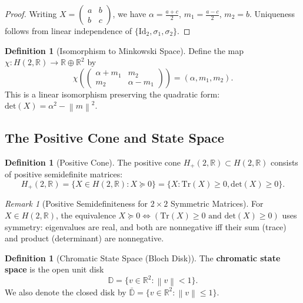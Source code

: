 \documentclass[11pt]{article}
\theoremstyle{plain}
\theoremstyle{definition}
\newtheorem{definition}[theorem]{Definition}
\theoremstyle{remark}
\newtheorem{remark}[theorem]{Remark}
\newcommand{\R}{\mathbb{R}}
\newcommand{\D}{\mathbb{D}}
\newcommand{\norm}[1]{\left\lVert #1 \right\rVert}
\newcommand{\Tr}{\mathrm{Tr}}
\newcommand{\Det}{\mathrm{det}}
\newcommand{\Id}{\mathrm{Id}}
\begin{document}
\begin{proof}
Writing $X = \begin{pmatrix} a & b \\ b & c \end{pmatrix}$, we have $\alpha = \frac{a+c}{2}$, $m_1 = \frac{a-c}{2}$, $m_2 = b$. Uniqueness follows from linear independence of $\{\Id_2, \sigma_1, \sigma_2\}$.
\end{proof}

\begin{definition}[Isomorphism to Minkowski Space]
Define the map $\chi: H(2,\R) \to \R \oplus \R^2$ by
\begin{equation}
\chi\left( \begin{pmatrix} \alpha + m_1 & m_2 \\ m_2 & \alpha - m_1 \end{pmatrix} \right) = (\alpha, m_1, m_2).
\end{equation}
This is a linear isomorphism preserving the quadratic form: $\Det(X) = \alpha^2 - \norm{m}^2$.
\end{definition}

\subsection{The Positive Cone and State Space}

\begin{definition}[Positive Cone]
The positive cone $H_+(2,\R) \subset H(2,\R)$ consists of positive semidefinite matrices:
\begin{equation}
H_+(2,\R) = \{ X \in H(2,\R) : X \succeq 0 \} = \{ X : \Tr(X) \geq 0, \Det(X) \geq 0 \}.
\end{equation}
\end{definition}

\begin{remark}[Positive Semidefiniteness for $2 \times 2$ Symmetric Matrices]
For $X \in H(2,\R)$, the equivalence $X \succeq 0 \Leftrightarrow (\Tr(X) \geq 0 \text{ and } \Det(X) \geq 0)$ uses symmetry: eigenvalues are real, and both are nonnegative iff their sum (trace) and product (determinant) are nonnegative.
\end{remark}

\begin{definition}[Chromatic State Space (Bloch Disk)]
\label{def:bloch-disk}
The \textbf{chromatic state space} is the open unit disk
\begin{equation}
\D = \{ v \in \R^2 : \norm{v} < 1 \}.
\end{equation}
We also denote the closed disk by $\bar{\D} = \{ v \in \R^2 : \norm{v} \leq 1 \}$.
\end{definition}
\end{document}
